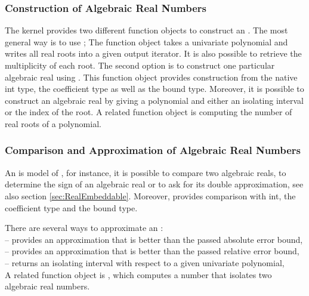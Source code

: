 \subsubsection{Construction of Algebraic Real Numbers }

The kernel provides two different function objects to construct an
. The most general way
is to use ; The function object
takes a univariate polynomial and writes all real roots into a given
output iterator. It is also possible to retrieve the multiplicity of
each root. The second option is to construct one particular algebraic
real using .
This function object provides construction from the native int type, the
coefficient type as well as the bound type.  Moreover, it is possible
to construct an algebraic real by giving a polynomial and either an
isolating interval or the index of the root. A related function object
is  computing the number
of real roots of a polynomial.



\subsubsection{ Comparison and Approximation of Algebraic Real Numbers}

An  is model of
, for instance, it is possible to compare two
algebraic reals, to determine the sign of an algebraic real or to ask
for its double approximation, see also section \ref{sec:RealEmbeddable}.
Moreover,  provides
comparison with int, the coefficient type and the bound type.

There are several ways to approximate an :\\
 -- provides an approximation that is 
better than the passed absolute error bound,\\
 -- provides an approximation that is 
better than the passed relative error bound,\\
 -- returns an isolating interval with respect to 
a given univariate polynomial,\\
A related function object is , which computes 
a number that isolates two algebraic real numbers. 

